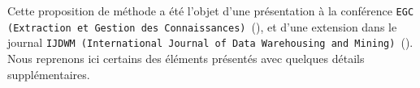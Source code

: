 	\begin{leftBarInformation}
		Cette proposition de méthode a été l'objet d'une présentation à la conférence \texttt{EGC (Extraction et Gestion des Connaissances)}~(\cite{schild-etal:2021:conception-iterative-semisupervisee}), et d'une extension dans le journal \texttt{IJDWM (International Journal of Data Warehousing and Mining)}~(\cite{schild-etal:2022:iterative-semisupervised-design}).
		Nous reprenons ici certains des éléments présentés avec quelques détails supplémentaires.
	\end{leftBarInformation}

	\minitoc


	


	


	